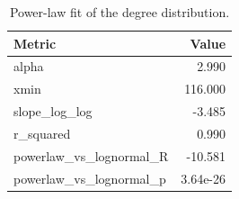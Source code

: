 \begin{table}[t]
\centering
\caption{Power-law fit of the degree distribution.}
\label{tab:powerlaw}
\begin{tabular}{lr}
\toprule
Metric & Value \\
\midrule
alpha & 2.990 \\
xmin & 116.000 \\
slope\_log\_log & -3.485 \\
r\_squared & 0.990 \\
powerlaw\_vs\_lognormal\_R & -10.581 \\
powerlaw\_vs\_lognormal\_p & 3.64e-26 \\
\bottomrule
\end{tabular}
\end{table}
